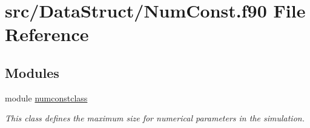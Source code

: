 \hypertarget{_num_const_8f90}{}\section{src/\+Data\+Struct/\+Num\+Const.f90 File Reference}
\label{_num_const_8f90}
\subsection*{Modules}
\begin{DoxyCompactItemize}
\item 
module \mbox{\hyperlink{namespacenumconstclass}{numconstclass}}
\begin{DoxyCompactList}\small\item\em This class defines the maximum size for numerical parameters in the simulation. \end{DoxyCompactList}\end{DoxyCompactItemize}
